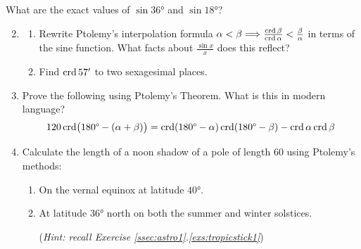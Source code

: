 


\begin{exercises}{}{}
	\exstart What are the exact values of $\sin\ang{36}$ and $\sin\ang{18}$?
	
	\begin{enumerate}\setcounter{enumi}{1}
	  \item\begin{enumerate}
	    \item Rewrite Ptolemy's interpolation formula $\alpha<\beta\Longrightarrow \frac{\crd\beta}{\crd\alpha}<\frac\beta\alpha$ in terms of the sine function. What facts about $\frac{\sin x}x$ does this reflect?
	    \item Find $\crd 57'$ to two sexagesimal places.
	  \end{enumerate} 
	  
	  \item%
	  Prove the following using Ptolemy's Theorem. What is this in modern language?
	  \[
	  	120\crd\bigl(\ang{180}-(\alpha+\beta)\bigr) =\crd(\ang{180}-\alpha)\crd(\ang{180}-\beta)-\crd\alpha\crd\beta
	  \]
	  
	  
	  \item%
	  Calculate the length of a noon shadow of a pole of length 60 using Ptolemy's methods:
	  \begin{enumerate}
	    \item On the vernal equinox at latitude $\ang{40}$.
	  	\item%
	  	At latitude \ang{36} north on both the summer and winter solstices.\par
	  (\emph{Hint: recall Exercise \ref*{ssec:astro1}.\ref{exs:tropicstick1}})
	  \end{enumerate}
	\end{enumerate}
\end{exercises}